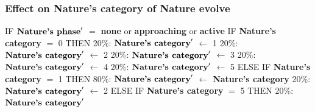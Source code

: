 \documentclass{article}%
\begin{document}
\subsubsection{Effect on Nature's category of Nature evolve}%
\label{ssubsec:Effect on Nature's category of Nature evolve}%
\begin{flushleft}%
IF %
$\mbox{\textbf{Nature's phase}} '$%
$=$%
\textbf{none}%
 or %
\textbf{approaching}%
 or %
\textbf{active}%
\linebreak%
\hspace*{2em}%
IF %
\textbf{Nature's category}%
$=$%
0%
\linebreak%
\hspace*{4em}%
THEN %
\linebreak%
\hspace*{6em}%
20\%: %
$\mbox{\textbf{Nature's category}} '$%
$\leftarrow$%
1%
\linebreak%
\hspace*{6em}%
20\%: %
$\mbox{\textbf{Nature's category}} '$%
$\leftarrow$%
2%
\linebreak%
\hspace*{6em}%
20\%: %
$\mbox{\textbf{Nature's category}} '$%
$\leftarrow$%
3%
\linebreak%
\hspace*{6em}%
20\%: %
$\mbox{\textbf{Nature's category}} '$%
$\leftarrow$%
4%
\linebreak%
\hspace*{6em}%
20\%: %
$\mbox{\textbf{Nature's category}} '$%
$\leftarrow$%
5%
\linebreak%
\hspace*{4em}%
ELSE %
IF %
\textbf{Nature's category}%
$=$%
1%
\linebreak%
\hspace*{6em}%
THEN %
\linebreak%
\hspace*{8em}%
80\%: %
$\mbox{\textbf{Nature's category}} '$%
$\leftarrow$%
\textbf{Nature's category}%
\linebreak%
\hspace*{8em}%
20\%: %
$\mbox{\textbf{Nature's category}} '$%
$\leftarrow$%
2%
\linebreak%
\hspace*{6em}%
ELSE %
IF %
\textbf{Nature's category}%
$=$%
5%
\linebreak%
\hspace*{8em}%
THEN %
\linebreak%
\hspace*{10em}%
20\%: %
$\mbox{\textbf{Nature's category}} '$%

\end{flushleft}
\end{document}
